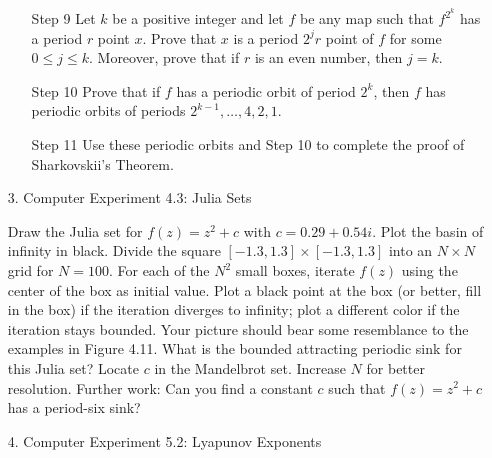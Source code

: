\documentclass[12pt,letterpaper,reqno]{amsart}
\begin{document}
\begin{enumerate}
\begin{enumerate}
\begin{flushleft}
    \end{flushleft}
    
    \item[Step 9] Let $k$ be a positive integer and let $f$ be any map such that $f^{2^k}$ has a period $r$ point $x$. Prove that $x$ is a period $2^jr$ point of $f$ for some $0 \leq j \leq k$. Moreover, prove that if $r$ is an even number, then $j = k$.
    \begin{flushleft}
    
    \end{flushleft}
    
    \item[Step 10] Prove that if $f$ has a periodic orbit of period $2^k$, then $f$ has periodic orbits of periods $2^{k-1}, \ldots, 4, 2, 1$.
    \begin{flushleft}
    
    \end{flushleft}
    
    \item[Step 11] Use these periodic orbits and Step 10 to complete the proof of Sharkovskii’s Theorem.
    \begin{flushleft}
    
    \end{flushleft}
\end{enumerate}

\newpage
\item[3.] Computer Experiment 4.3: Julia Sets\newline

Draw the Julia set for $f(z) = z^2 + c$ with $c = 0.29 + 0.54i$. Plot the basin of infinity in black. Divide the square $[-1.3,1.3] \times [-1.3, 1.3]$ into an $N \times N$ grid for $N = 100$. For each of the $N^2$ small boxes, iterate $f(z)$ using the center of the box as initial value. Plot a black point at the box (or better, fill in the box) if the iteration diverges to infinity; plot a different color if the iteration stays bounded. Your picture should bear some resemblance to the examples in Figure 4.11. What is the bounded attracting periodic sink for this Julia set? Locate $c$ in the Mandelbrot set. Increase $N$ for better resolution. Further work: Can you find a constant $c$ such that $f(z) = z^2 + c$ has a period-six sink?

\begin{flushleft}

\end{flushleft}

\newpage
\item[4.] Computer Experiment 5.2: Lyapunov Exponents\newline


\end{enumerate}
\end{document}
